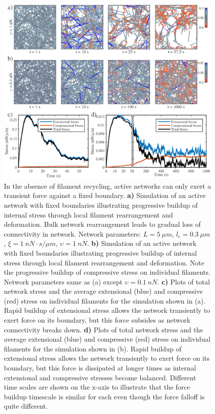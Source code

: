 \documentclass[10pt,letterpaper]{article}
\begin{document}
\begin{figure}[h!]
	\centering
	\includegraphics[width=\hsize]{figures/figure6}
	\caption{\label{fig:active_str} In the absence of filament recycling, active networks can only exert a transient force against a fixed boundary.  \textbf{a)} Simulation of an active network with fixed boundaries illustrating progressive buildup of internal stress through local filament rearrangement and deformation. Bulk network rearrangement leads to gradual loss of connectivity in network.  Network parameters: $L=5\: \mu m$, $l_c=0.3\: \mu m$, $\xi=1\: nN\cdot s/\mu m$, $\upsilon=1\: nN$.  \textbf{b)} Simulation of an active network with fixed boundaries illustrating progressive buildup of internal stress through local filament rearrangement and deformation. Note the progressive buildup of compressive stress on individual filaments. Network parameters same as (a) except $\upsilon=0.1\: nN$.  \textbf{c)} Plots of total network stress and the average extensional (blue) and compressive (red) stress on individual filaments for the simulation shown in (a). Rapid buildup of extensional stress allows the network transiently to exert force on its boundary, but this force subsides as network connectivity breaks down.  \textbf{d)} Plots of total network stress and the average extensional (blue) and compressive (red) stress on individual filaments for the simulation shown in (b). Rapid buildup of extensional stress allows the network transiently to exert force on its boundary, but this force is dissipated at longer times as internal extensional and compressive stresses become balanced.  Different time scales are shown on the x-axis to illustrate that the force buildup timescale is similar for each even though the force falloff is quite different.}
\end{figure}
\end{document}
